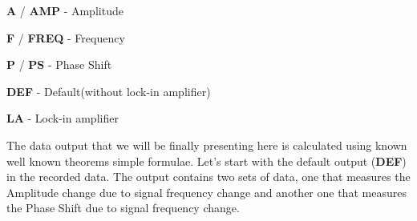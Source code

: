 \documentclass[twocolumn]{article}\usepackage[english]{babel}
\begin{document}
\begin{Steps}
 \item{\textbf{A} / \textbf{AMP} - Amplitude}
 \item{\textbf{F} / \textbf{FREQ} - Frequency }
 \item{\textbf{P} / \textbf{PS}  - Phase Shift}
 \item{\textbf{DEF} - Default(without lock-in amplifier)}
 \item{\textbf{LA} - Lock-in amplifier}
\end{Steps}
\newline \newline
The data output that we will be finally presenting here is calculated using known well known theorems simple formulae. Let's start with the default output (\textbf{DEF}) in the recorded data. The output contains two sets of data, one that measures the Amplitude change due to signal frequency change and another one that measures the Phase Shift due to signal frequency change. 
\end{document}
